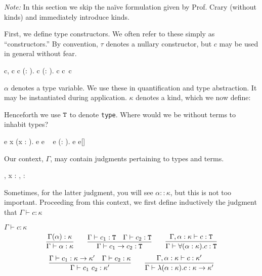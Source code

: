 
\emph{Note:} In this section we skip the na\"ive formulation given by Prof. Crary
(without kinds) and immediately introduce kinds.

First, we define type constructors. We often refer to these simply as ``constructors.''
By convention, $\tau$ denotes a nullary constructor, but $c$ may be used in general
without fear.
\begin{bnf}
  c, \tau \bnfeq
  \alpha
  \alt c \rightarrow c
  \alt \forall(\alpha : \kappa). c
  \alt \lambda(\alpha : \kappa). c
  \alt c~c
\end{bnf}

$\alpha$ denotes a type variable. We use these in quantification and type abstraction.
It may be instantiated during application. $\kappa$ denotes a kind, which we now
define:
\begin{bnf}
  \kappa \bnfeq
  \alt \kappa \rightarrow \kappa
\end{bnf}
Henceforth we use $\textnormal{\texttt{T}}$ to denote \texttt{type}.
Where would we be without terms to inhabit types?
\begin{bnf}
  e \bnfeq x
  \alt \lambda(x : \tau). e
  \alt e ~ e
  \alt \Lambda(\alpha : \kappa). e
  \alt e[\tau]
\end{bnf}

Our context, $\Gamma$, may contain judgments pertaining to types and terms.
\begin{bnf}
  \Gamma \bnfeq \varepsilon
  \alt \Gamma, x : \tau
  \alt \Gamma, \alpha : \kappa
\end{bnf}

Sometimes, for the latter judgment, you will see $\alpha :: \kappa$, but this is
not too important. Proceeding from this context, we first define inductively
the judgment that $\Gamma \vdash c : \kappa$

\begin{judgment}
  $\Gamma \vdash c : \kappa$
\[
  \infer{\Gamma \vdash \alpha : \kappa}{\Gamma(\alpha) : \kappa}
  \qquad
  \infer{\Gamma \vdash c_1 \rightarrow c_2 : \T}
        {\Gamma \vdash c_1 : \T
        &\Gamma \vdash c_2 : \T
        }
  \qquad
  \infer{\Gamma \vdash \forall(\alpha : \kappa).c : \T}
        {\Gamma, \alpha : \kappa \vdash c : \T}
\]
\[
  \infer{\Gamma \vdash c_1 ~ c_2 : \kappa'}
        {\Gamma \vdash c_1 : \kappa \rightarrow \kappa'
        &\Gamma \vdash c_2 : \kappa
        }
  \qquad
  \infer{\Gamma \vdash \lambda(\alpha : \kappa).c : \kappa \to \kappa'}
        {\Gamma, \alpha : \kappa \vdash c : \kappa'}
\]
\end{judgment}

